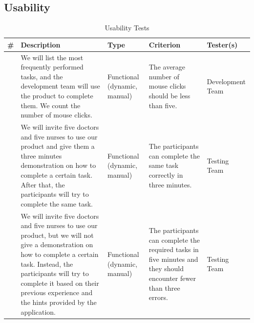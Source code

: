 \documentclass[12pt]{article}
\newcounter{TestCounter}
\begin{document}
\subsection{Usability}
\begin{center}
	\begin{longtable}{c>{\raggedright\arraybackslash}p{4.8cm} >{\raggedright\arraybackslash}p{3.5cm}>{\raggedright\arraybackslash}p{3cm}>{\raggedright\arraybackslash}p{3cm}}
		\caption{Usability Tests}\label{Usability Tests}\\
		\toprule
		\bf \# & \bf Description & \bf Type & \bf Criterion & Tester(s) \\\midrule
		\stepcounter{TestCounter}\arabic{TestCounter} 
		& We will list the most frequently performed tasks, and the development
		team will use the product to complete them. We count the number of
		mouse clicks.
		& Functional (dynamic, manual)	
		& The average number of mouse clicks should be less than five.    
		& 	Development Team
		\\\midrule
		\stepcounter{TestCounter}\arabic{TestCounter} 
		& We will invite five doctors and five nurses to use our product and
		give them a three minutes demonstration on how to complete a certain
		task. After that, the participants will try to complete the same task.
		& Functional (dynamic, manual)	
		& The participants can complete the same task correctly in three minutes.  
		& 	Testing Team
		\\\midrule
		\stepcounter{TestCounter}\arabic{TestCounter} 
		& We will invite five doctors and five nurses to use our product, but
		we will not give a demonstration on how to complete a certain task.
		Instead, the participants will try to complete it based
		on their previous experience and the hints provided by the application.
		& Functional (dynamic, manual)	
		& The participants can complete the required tasks in five minutes and
		they should encounter fewer than three errors.  
		& 	Testing Team
		\\\midrule
		\bottomrule
	\end{longtable}
\end{center}
\end{document}

